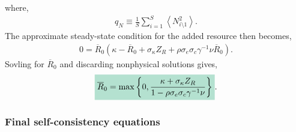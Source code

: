 \documentclass[10pt]{article}
\newcommand{\mathcolorbox}[1]{\colorbox{hlcol}{$\displaystyle #1$}}
\newcommand{\eval}[1]{\left\langle #1 \right\rangle}
\begin{document}
where,
\begin{align}
	q_N \equiv
	\frac{1}{S}
	\sum_{i=1}^S \eval{N_{i\setminus 1}^2}.
\end{align}
The approximate steady-state condition for the added resource then becomes,
\begin{align}
	0 = \overline R_0
	\left(
		\kappa - \overline R_0 + \sigma_\kappa Z_R + \rho \sigma_e \sigma_c \gamma^{-1} \nu \overline R_0
	\right).
	\label{R0selfconsist}
\end{align}
Sovling for $\overline R_0$ and discarding nonphysical solutions gives,
\begin{align}
	\mathcolorbox{
	\overline R_0 
	=
	\max\left\{
		0,
		\frac{\kappa+ \sigma_\kappa Z_R}{1- \rho \sigma_e \sigma_c \gamma^{-1} \nu}
	\right\}
	}.
\end{align}

\subsubsection{Final self-consistency equations}
\end{document}
